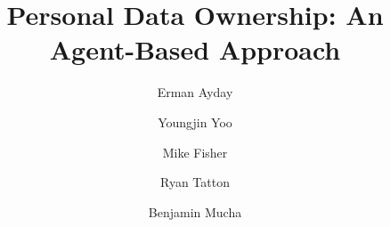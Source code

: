 \title{Personal Data Ownership: \newline An Agent-Based Approach}

\author{
    Erman Ayday \and
    Youngjin Yoo \and
    Mike Fisher \and
    Ryan Tatton \and
    Benjamin Mucha
}



\maketitle

\begin{abstract}
\end{abstract}